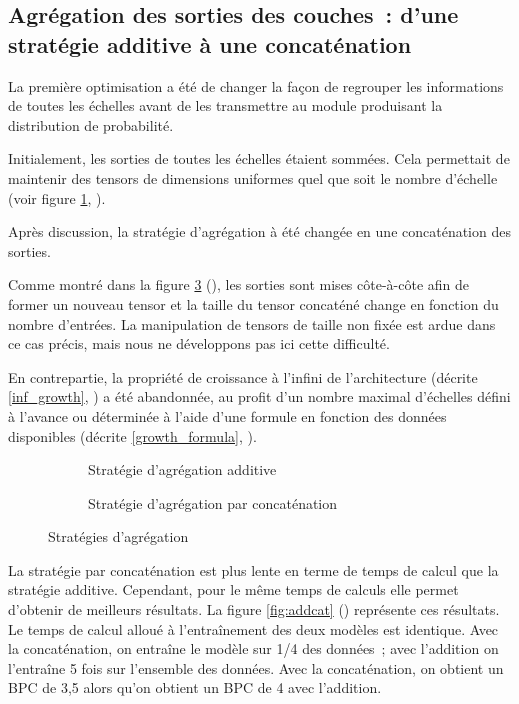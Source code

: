 \subsection[Agrégation des sorties des couches]{Agrégation des sorties des couches~: d'une stratégie additive à une concaténation}\label{subsec:addcat_}
La première optimisation a été de changer la façon de regrouper les informations de toutes les \og échelles\fg{} avant de les transmettre au module produisant la distribution de probabilité.

Initialement, les sorties de toutes les \og échelles\fg{} étaient sommées. Cela permettait de maintenir des \glspl{tensor} de dimensions uniformes quel que soit le nombre d'\og échelle\fg{} (voir figure \ref{fig:add}, ).

Après discussion, la stratégie d'agrégation à été changée en une concaténation des sorties.

Comme montré dans la figure \ref{fig:cat} (), les sorties sont mises côte-à-côte afin de former un nouveau \gls{tensor} et la taille du \gls{tensor} concaténé change en fonction du nombre d'entrées.
La manipulation de \glspl{tensor} de taille non fixée est ardue dans ce cas précis, mais nous ne développons pas ici cette difficulté.

En contrepartie, la propriété de croissance à l'infini de l'architecture (décrite \autoref{inf_growth}, ) a été abandonnée, au profit d'un nombre maximal d'échelles défini à l'avance ou déterminée à l'aide d'une formule en fonction des données disponibles (décrite \mbox{\autoref{growth_formula}}, ).

\begin{figure}[ht]
	\begin{subfigure}{0.45\textwidth}
		\centering
		\scalebox{1}{}
		\caption[Stratégie d'agrégation additive]{Stratégie d'agrégation additive}\label{fig:add}
	\end{subfigure}
	\begin{subfigure}{0.45\textwidth}
		\centering
		\scalebox{1}{}
		\caption[Stratégie d'agrégation par concaténation]{Stratégie d'agrégation par concaténation}\label{fig:cat}
	\end{subfigure} 
	\caption{Stratégies d'agrégation}
\end{figure}

La stratégie par concaténation est plus lente en terme de temps de calcul que la stratégie additive. Cependant, pour le même temps de calculs elle permet d'obtenir de meilleurs résultats. La figure \ref{fig:addcat} () représente ces résultats. Le temps de calcul alloué à l'entraînement des deux modèles est identique. Avec la concaténation, on entraîne le modèle sur 1/4 des données~; avec l'addition on l'entraîne 5 fois sur l'ensemble des données. Avec la concaténation, on obtient un BPC de 3,5 alors qu'on obtient un BPC de 4 avec l'addition.


